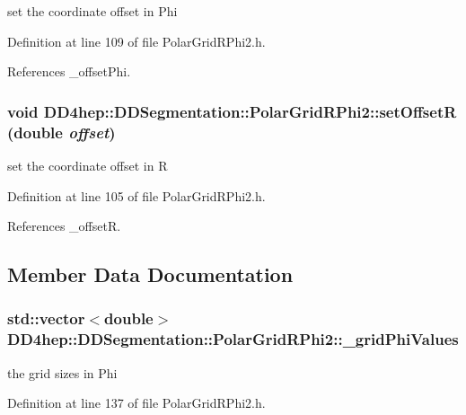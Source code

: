 set the coordinate offset in Phi 

Definition at line 109 of file PolarGridRPhi2.h.

References \_\-offsetPhi.\hypertarget{class_d_d4hep_1_1_d_d_segmentation_1_1_polar_grid_r_phi2_afe071e7c5168bda97cac7c4a64c9265e}{
\subsubsection[{setOffsetR}]{\setlength{\rightskip}{0pt plus 5cm}void DD4hep::DDSegmentation::PolarGridRPhi2::setOffsetR (double {\em offset})}}
\label{class_d_d4hep_1_1_d_d_segmentation_1_1_polar_grid_r_phi2_afe071e7c5168bda97cac7c4a64c9265e}


set the coordinate offset in R 

Definition at line 105 of file PolarGridRPhi2.h.

References \_\-offsetR.

\subsection{Member Data Documentation}
\hypertarget{class_d_d4hep_1_1_d_d_segmentation_1_1_polar_grid_r_phi2_a078188d23dac5d6ed26c85dddf0f9e74}{
\subsubsection[{\_\-gridPhiValues}]{\setlength{\rightskip}{0pt plus 5cm}std::vector$<$double$>$ {\bf DD4hep::DDSegmentation::PolarGridRPhi2::\_\-gridPhiValues}}}
\label{class_d_d4hep_1_1_d_d_segmentation_1_1_polar_grid_r_phi2_a078188d23dac5d6ed26c85dddf0f9e74}


the grid sizes in Phi 

Definition at line 137 of file PolarGridRPhi2.h.

